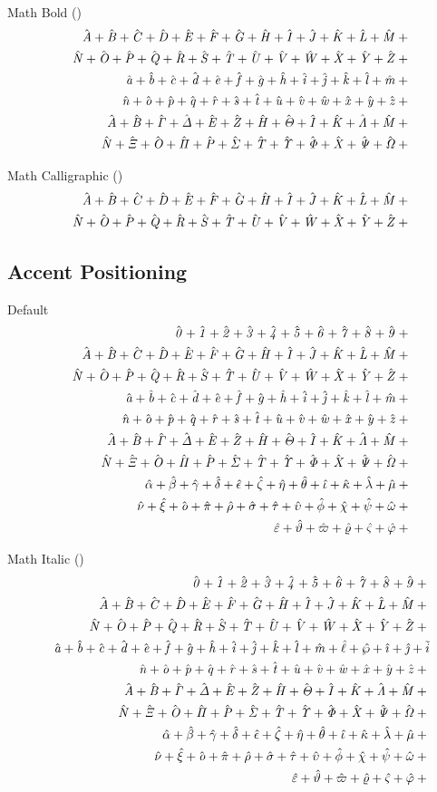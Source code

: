 \documentclass[12pt, a4paper, oneside]{article}
\theoremstyle{Plain}
\theoremstyle{Definition}
\theoremstyle{Remark}
\begin{document}
\begin{appendix}
Math Bold (\texttt{\string\mathbf})
\def\test#1{\mathbf{#1}_{i}+{}}%
\begin{eqnarray*}
  && {\testupperi}\\
  && {\testupperii}\\
  && {\testloweri}\\
  && {\testlowerii}\\
  && {\testupgreeki}\\
  && {\testupgreekii}
\end{eqnarray*}%

Math Calligraphic (\texttt{\string\mathcal})
\def\test#1{\mathcal{#1}_{i}+{}}%
\begin{eqnarray*}
  && {\testupperi}\\
  && {\testupperii}
\end{eqnarray*}%


\subsection{Accent Positioning \showfamily}

Default
\def\test#1{\hat{#1}+{}}%
\begin{eqnarray*}
  && {\testnums}\\
  && {\testupperi}\\
  && {\testupperii}\\
  && {\testloweri}\\
  && {\testlowerii}\\
  && {\testupgreeki}\\
  && {\testupgreekii}\\
  && {\testlowgreeki}\\
  && {\testlowgreekii}\\
  && {\testlowgreekiii}
\end{eqnarray*}%

Math Italic (\texttt{\string\mathit})
\def\test#1{\hat{\mathit{#1}}+{}}%
\begin{eqnarray*}
  && {\testnums}\\
  && {\testupperi}\\
  && {\testupperii}\\
  && {\testloweri} \test\ell \test\wp \test\imath \test\jmath \tilde{i} \\
  && {\testlowerii}\\
  && {\testupgreeki}\\
  && {\testupgreekii}\\
  && {\testlowgreeki}\\
  && {\testlowgreekii}\\
  && {\testlowgreekiii}
\end{eqnarray*}%


\end{appendix}
\end{document}

